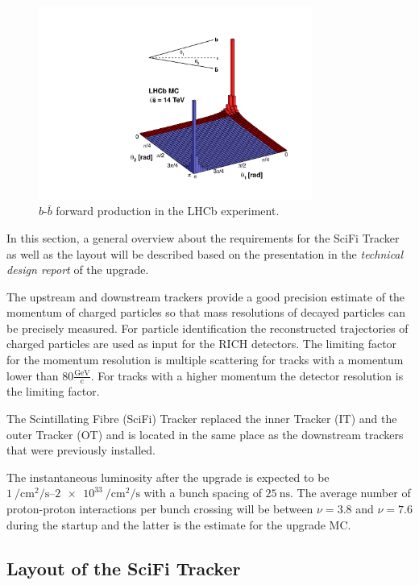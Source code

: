 \begin{figure}
  \centering
  \includegraphics[width=0.8\textwidth]{plots/lhcb_forward.pdf}
  \caption{$b$-$\bar{b}$ forward production in the LHCb experiment\cite{bbangles}.}
  \label{fig:bbforward}
\end{figure}

In this section, a general overview about the requirements for the SciFi Tracker as well as the layout will be described based on the presentation in the \textit{technical design report}\cite{scifiInfo} of the upgrade.

The upstream and downstream trackers provide a good precision estimate of the momentum of charged particles so that mass resolutions of decayed particles can be precisely measured.
For particle identification the reconstructed trajectories of charged particles are used as input for the RICH detectors.
The limiting factor for the momentum resolution is multiple scattering for tracks with a momentum lower than $\num{80}\frac{\text{GeV}}{\text{c}}$. For tracks with a higher momentum the detector resolution is the limiting factor.

The Scintillating Fibre (SciFi) Tracker replaced the inner Tracker (IT) and the outer Tracker (OT)
and is located in the same place as the downstream trackers that were previously installed.

The instantaneous luminosity after the upgrade is expected to be $\SIrange{1}{2e33}{\per\centi\metre\squared\per\second}$ with a bunch spacing of $\SI{25}{\nano\second}$.
The average number of proton-proton interactions per bunch crossing will be between
$\nu = 3.8$ and $\nu = 7.6$ during the startup and the latter is the estimate for the upgrade MC.

\subsection{Layout of the SciFi Tracker}

